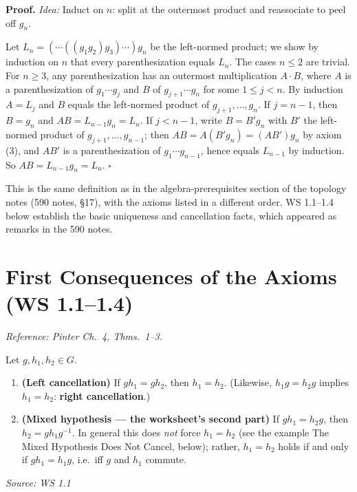 \documentclass[11pt]{report}
\renewenvironment{proof}[1][Proof]{\noindent\textbf{#1.} }{\hfill$\square$\par\vspace{5pt}}
\newcommand{\srcline}[1]{\par\hfill{\footnotesize\textit{Source: #1}}}
\begin{document}
\begin{proof}
\textit{Idea:} Induct on $n$: split at the outermost product and reassociate to peel off $g_n$.\par
Let $L_n = (\cdots((g_1g_2)g_3)\cdots)g_n$ be the left-normed product; we show by induction on $n$ that every parenthesization equals $L_n$. The cases $n \leq 2$ are trivial. For $n \geq 3$, any parenthesization has an outermost multiplication $A \cdot B$, where $A$ is a parenthesization of $g_1 \cdots g_j$ and $B$ of $g_{j+1} \cdots g_n$ for some $1 \leq j < n$. By induction $A = L_j$ and $B$ equals the left-normed product of $g_{j+1}, \ldots, g_n$. If $j = n - 1$, then $B = g_n$ and $AB = L_{n-1}g_n = L_n$. If $j < n - 1$, write $B = B'g_n$ with $B'$ the left-normed product of $g_{j+1}, \ldots, g_{n-1}$; then $AB = A(B'g_n) = (AB')g_n$ by axiom (3), and $AB'$ is a parenthesization of $g_1 \cdots g_{n-1}$, hence equals $L_{n-1}$ by induction. So $AB = L_{n-1}g_n = L_n$.
\end{proof}

\begin{rembox}\label{rem:comparison-math-590}
This is the same definition as in the algebra-prerequisites section of the topology notes (590 notes, \S 17), with the axioms listed in a different order. WS 1.1--1.4 below establish the basic uniqueness and cancellation facts, which appeared as remarks in the 590 notes.
\end{rembox}

\section{First Consequences of the Axioms (WS 1.1--1.4)}\label{sec:consequences}

\textit{Reference: Pinter Ch.\ 4, Thms.\ 1--3.}

\begin{propbox}\label{prop:cancellation-what-mixed-hypothesis-really-gives}
Let $g, h_1, h_2 \in G$.
\begin{enumerate}
    \item \textbf{(Left cancellation)} If $g h_1 = g h_2$, then $h_1 = h_2$. (Likewise, $h_1 g = h_2 g$ implies $h_1 = h_2$: \textbf{right cancellation}.)
    \item \textbf{(Mixed hypothesis --- the worksheet's second part)} If $g h_1 = h_2 g$, then $h_2 = g h_1 g^{-1}$. In general this does \emph{not} force $h_1 = h_2$ (see the example The Mixed Hypothesis Does Not Cancel, below); rather, $h_1 = h_2$ holds if and only if $g h_1 = h_1 g$, i.e.\ iff $g$ and $h_1$ commute.
\end{enumerate}
\srcline{WS 1.1}
\end{propbox}
\end{document}
